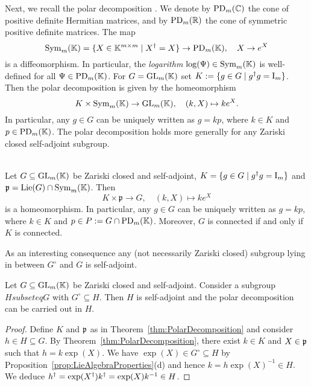 Next, we recall the polar decomposition \cite[Section~2.5]{HallBook}. We denote by $\operatorname{PD}_m(\mathbb C)$ the cone of positive definite Hermitian matrices, and by $\operatorname{PD}_m(\mathbb R)$ the cone of symmetric positive definite matrices. The map
	\[ \operatorname{Sym}_m(\mathbb K) = \{ X \in \mathbb K^{m \times m} \mid X^{\dagger} = X\} \to \operatorname{PD}_m(\mathbb K), \quad X \to e^X \]
is a diffeomorphism. In particular, the \emph{logarithm} $\log(\Psi) \in \operatorname{Sym}_m(\mathbb K)$ is well-defined for all $\Psi \in \operatorname{PD}_m(\mathbb K)$.
For $G = \operatorname{GL}_m(\mathbb K)$ set $K := \{ g \in G \mid g^{\dagger} g = \operatorname{I}_m \}$. Then the polar decomposition is given by the homeomorphism
	\[ K \times \operatorname{Sym}_m(\mathbb K) \to \operatorname{GL}_m(\mathbb K) , \quad (k,X) \mapsto k e^X. \]
In particular, any $g \in G$ can be uniquely written as $g = kp$, where $k \in K$ and $p \in \operatorname{PD}_m(\mathbb K)$. 
The polar decomposition holds more generally for any Zariski closed self-adjoint subgroup.

\begin{theorem}  \label{thm:PolarDecomposition}
	\ \\
	Let $G \subseteq \operatorname{GL}_m(\mathbb K)$ be Zariski closed and self-adjoint, $K = \{g \in G \mid g^{\dagger} g = \operatorname{I}_m\}$ and $\mathfrak{p} = \operatorname{Lie}(G) \cap \operatorname{Sym}_m(\mathbb K)$.
	Then
	\begin{equation}\label{eq:PolarDecompositionMap}
		K \times \mathfrak{p} \to G, \quad (k,X) \mapsto k e^{X}
	\end{equation}
	is a homeomorphism. In particular, any $g \in G$ can be uniquely written as $g = kp$, where $k \in K$ and $p \in P := G \cap \operatorname{PD}_m(\mathbb K)$. Moreover, $G$ is connected if and only if $K$ is connected.
\end{theorem}

As an interesting consequence any (not necessarily Zariski closed) subgroup lying in between $G^\circ$ and $G$ is self-adjoint.

\begin{cor}\label{cor:PolarDecompositionSubgroup}
	Let $G \subseteq \operatorname{GL}_m(\mathbb K)$ be Zariski closed and self-adjoint. Consider a subgroup $H subseteq G$ with $G^\circ \subseteq H$. Then $H$ is self-adjoint and the polar decomposition can be carried out in $H$.
\end{cor}

\begin{proof}
	Define $K$ and $\mathfrak{p}$ as in Theorem~\ref{thm:PolarDecomposition} and consider $h \in H \subseteq G$. By Theorem~\ref{thm:PolarDecomposition}, there exist $k \in K$ and $X \in \mathfrak{p}$ such that $h = k \exp(X)$.
	 We have $\exp(X) \in G^\circ \subseteq H$ by Proposition~\ref{prop:LieAlgebraProperties}(d) and hence $k = h \exp(X)^{-1} \in H$. We deduce $h^{\dagger} = \exp(X^{\dagger}) k^{\dagger} = \exp(X) k^{-1} \in H$.
\end{proof}

